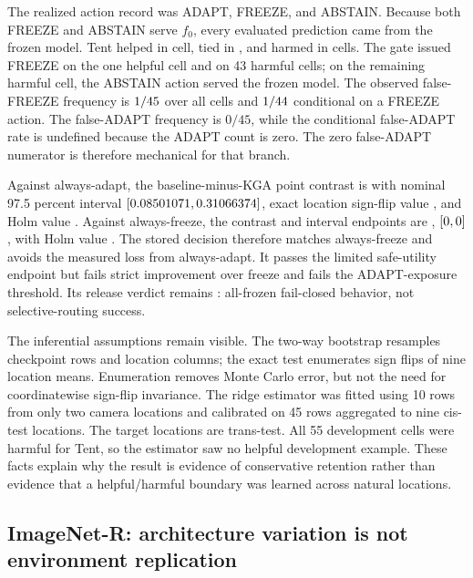 The realized action record was \CCTAdaptCount{} ADAPT, \CCTFreezeCount{} FREEZE, and
\CCTAbstainCount{} ABSTAIN.
Because both FREEZE and ABSTAIN serve $f_0$, every evaluated prediction came from the frozen model.
Tent helped in \CCTHelpfulCount{} cell, tied in \CCTZeroCount{}, and harmed in
\CCTHarmfulCount{} cells.  The gate issued FREEZE on the one helpful cell and on 43 harmful cells;
on the remaining harmful cell, the ABSTAIN action served the frozen model.  The observed
false-FREEZE frequency is
$1{}/45{}$ over all cells and
$1{}/44{}$ conditional on a FREEZE action.  The
false-ADAPT frequency is $0/45$, while the conditional false-ADAPT rate is undefined because the
ADAPT count is zero.  The zero false-ADAPT numerator is therefore mechanical for that branch.

Against always-adapt, the baseline-minus-KGA point contrast is \CCTVsAdaptPoint{} with nominal
97.5 percent interval $[0.08501071,0.31066374]$, exact location sign-flip value
\CCTVsAdaptExactP{}, and Holm value \CCTVsAdaptHolmP{}.  Against always-freeze, the contrast and
interval endpoints are \CCTVsFreezePoint{}, $[0,0]$, with
Holm value \CCTVsFreezeHolmP{}.  The stored decision therefore matches always-freeze and avoids the
measured loss from always-adapt.  It passes the limited safe-utility endpoint but fails strict
improvement over freeze and fails the ADAPT-exposure threshold.  Its release verdict remains
\CCTVerdict: all-frozen fail-closed behavior, not selective-routing success.

The inferential assumptions remain visible.  The two-way bootstrap resamples checkpoint rows and
location columns; the exact test enumerates sign flips of nine location means.  Enumeration removes
Monte Carlo error, but not the need for coordinatewise sign-flip invariance.  The ridge estimator
was fitted using 10 rows from only two camera locations and calibrated on 45 rows aggregated to
nine cis-test locations.  The target locations are trans-test.  All 55 development cells were
harmful for Tent, so the estimator saw no helpful development example.  These facts explain why
the result is evidence of conservative retention rather than evidence that a helpful/harmful
boundary was learned across natural locations.

\subsection{ImageNet-R: architecture variation is not environment replication}
\label{fr:sec-imagenetr-dossier}

